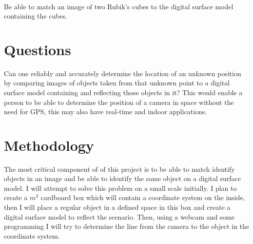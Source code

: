 \documentclass{article}
\begin{document}
\paragraph{}
Be able to match an image of two Rubik's cubes to the digital surface model containing the cubes.

\newpage

\section{Questions}
\paragraph{}
Can one reliably and accurately determine the location of an unknown position by comparing images of objects taken from that unknown point to a digital surface model containing and reflecting those objects in it? This would enable a person to be able to determine the position of a camera in space without the need for GPS, this may also have real-time and indoor applications.

\newpage

\section{Methodology}

\paragraph{}
The most critical component of of this project is to be able to match identify objects in an image and be able to identify the same object on a digital surface model. I will attempt to solve this problem on a small scale initially. I plan to create a $m^3$ cardboard box which will contain a coordinate system on the inside, then I will place a regular object in a defined space in this box and create a digital surface model to reflect the scenario. Then, using a webcam and some programming I will try to determine the line from the camera to the object in the coordinate system.
\end{document}
